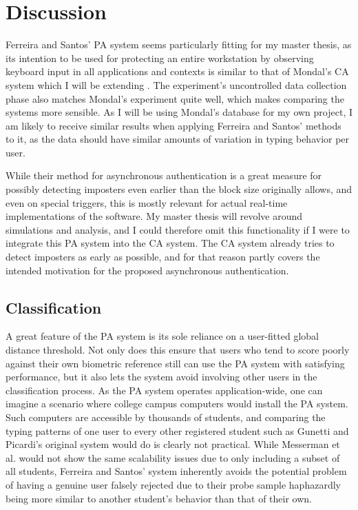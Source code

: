 \documentclass[informationsecurity]{gucmasterproject}
\begin{document}
\section{Discussion}
\label{sec:ferreira-discussion}
Ferreira and Santos' PA system seems particularly fitting for my master thesis, as its intention to be used for protecting an entire workstation by observing keyboard input in all applications and contexts is similar to that of Mondal's CA system which I will be extending \cite{mondal}.
The experiment's uncontrolled data collection phase also matches Mondal's experiment quite well, which makes comparing the systems more sensible.
As I will be using Mondal's database for my own project, I am likely to receive similar results when applying Ferreira and Santos' methods to it, as the data should have similar amounts of variation in typing behavior per user.

While their method for asynchronous authentication is a great measure for possibly detecting imposters even earlier than the block size originally allows, and even on special triggers, this is mostly relevant for actual real-time implementations of the software.
My master thesis will revolve around simulations and analysis, and I could therefore omit this functionality if I were to integrate this PA system into the CA system.
The CA system already tries to detect imposters as early as possible, and for that reason partly covers the intended motivation for the proposed asynchronous authentication.

\subsection{Classification}
A great feature of the PA system is its sole reliance on a user-fitted global distance threshold.
Not only does this ensure that users who tend to score poorly against their own biometric reference still can use the PA system with satisfying performance, but it also lets the system avoid involving other users in the classification process.
As the PA system operates application-wide, one can imagine a scenario where college campus computers would install the PA system.
Such computers are accessible by thousands of students, and comparing the typing patterns of one user to every other registered student such as Gunetti and Picardi's original system would do \cite{gnp} is clearly not practical.
While Messerman et al. \cite{Messerman} would not show the same scalability issues due to only including a subset of all students, Ferreira and Santos' system inherently avoids the potential problem of having a genuine user falsely rejected due to their probe sample haphazardly being more similar to another student's behavior than that of their own.
\end{document}
